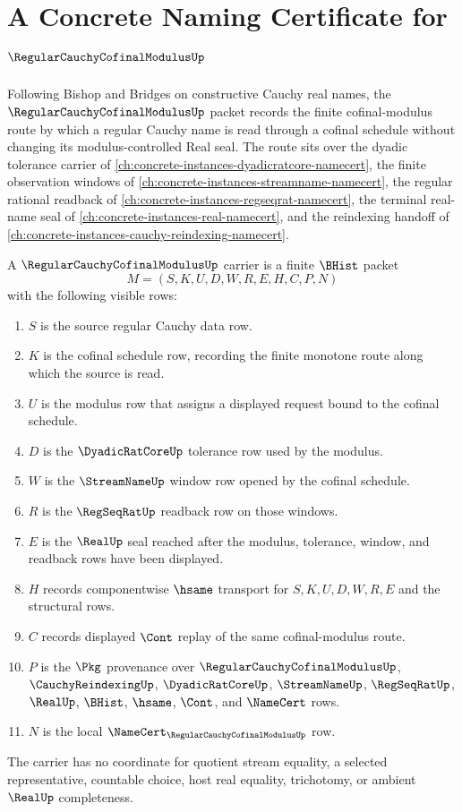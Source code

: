 \chapter{A Concrete Naming Certificate for $\RegularCauchyCofinalModulusUp$}
\label{ch:concrete-instances-regular-cauchy-cofinal-modulus-namecert}

Following Bishop and Bridges on constructive Cauchy real names, the $\RegularCauchyCofinalModulusUp$ packet records the finite cofinal-modulus route by which a regular Cauchy name is read through a cofinal schedule without changing its modulus-controlled Real seal. The route sits over the dyadic tolerance carrier of \autoref{ch:concrete-instances-dyadicratcore-namecert}, the finite observation windows of \autoref{ch:concrete-instances-streamname-namecert}, the regular rational readback of \autoref{ch:concrete-instances-regseqrat-namecert}, the terminal real-name seal of \autoref{ch:concrete-instances-real-namecert}, and the reindexing handoff of \autoref{ch:concrete-instances-cauchy-reindexing-namecert}.

\begin{definition}
\label{def:regular-cauchy-cofinal-modulus-carrier}
A $\RegularCauchyCofinalModulusUp$ carrier is a finite $\BHist$ packet
$$
M=(S,K,U,D,W,R,E,H,C,P,N)
$$
with the following visible rows:
\begin{enumerate}
\item $S$ is the source regular Cauchy data row.
\item $K$ is the cofinal schedule row, recording the finite monotone route along which the source is read.
\item $U$ is the modulus row that assigns a displayed request bound to the cofinal schedule.
\item $D$ is the $\DyadicRatCoreUp$ tolerance row used by the modulus.
\item $W$ is the $\StreamNameUp$ window row opened by the cofinal schedule.
\item $R$ is the $\RegSeqRatUp$ readback row on those windows.
\item $E$ is the $\RealUp$ seal reached after the modulus, tolerance, window, and readback rows have been displayed.
\item $H$ records componentwise $\hsame$ transport for $S,K,U,D,W,R,E$ and the structural rows.
\item $C$ records displayed $\Cont$ replay of the same cofinal-modulus route.
\item $P$ is the $\Pkg$ provenance over $\RegularCauchyCofinalModulusUp$, $\CauchyReindexingUp$, $\DyadicRatCoreUp$, $\StreamNameUp$, $\RegSeqRatUp$, $\RealUp$, $\BHist$, $\hsame$, $\Cont$, and $\NameCert$ rows.
\item $N$ is the local $\NameCert_{\RegularCauchyCofinalModulusUp}$ row.
\end{enumerate}
The carrier has no coordinate for quotient stream equality, a selected representative, countable choice, host real equality, trichotomy, or ambient $\RealUp$ completeness.
\end{definition}

